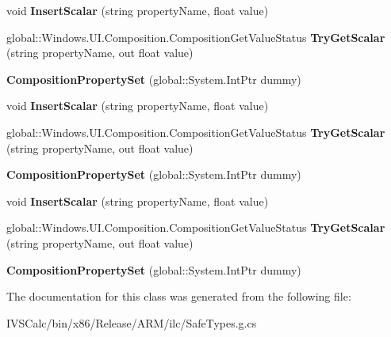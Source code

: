 \begin{DoxyCompactItemize}
void {\bfseries Insert\+Scalar} (string property\+Name, float value)
\item 
\mbox{\label{class_windows_1_1_u_i_1_1_composition_1_1_composition_property_set_ac649cea8ddd129ed7dba686111ace9a4}} 
global\+::\+Windows.\+U\+I.\+Composition.\+Composition\+Get\+Value\+Status {\bfseries Try\+Get\+Scalar} (string property\+Name, out float value)
\item 
\mbox{\label{class_windows_1_1_u_i_1_1_composition_1_1_composition_property_set_a1ffccc724ef124c5ca089ed009f6185a}} 
{\bfseries Composition\+Property\+Set} (global\+::\+System.\+Int\+Ptr dummy)
\item 
\mbox{\label{class_windows_1_1_u_i_1_1_composition_1_1_composition_property_set_abe4cc8bd1cdacfc5561505c7afcedab9}} 
void {\bfseries Insert\+Scalar} (string property\+Name, float value)
\item 
\mbox{\label{class_windows_1_1_u_i_1_1_composition_1_1_composition_property_set_ac649cea8ddd129ed7dba686111ace9a4}} 
global\+::\+Windows.\+U\+I.\+Composition.\+Composition\+Get\+Value\+Status {\bfseries Try\+Get\+Scalar} (string property\+Name, out float value)
\item 
\mbox{\label{class_windows_1_1_u_i_1_1_composition_1_1_composition_property_set_a1ffccc724ef124c5ca089ed009f6185a}} 
{\bfseries Composition\+Property\+Set} (global\+::\+System.\+Int\+Ptr dummy)
\item 
\mbox{\label{class_windows_1_1_u_i_1_1_composition_1_1_composition_property_set_abe4cc8bd1cdacfc5561505c7afcedab9}} 
void {\bfseries Insert\+Scalar} (string property\+Name, float value)
\item 
\mbox{\label{class_windows_1_1_u_i_1_1_composition_1_1_composition_property_set_ac649cea8ddd129ed7dba686111ace9a4}} 
global\+::\+Windows.\+U\+I.\+Composition.\+Composition\+Get\+Value\+Status {\bfseries Try\+Get\+Scalar} (string property\+Name, out float value)
\item 
\mbox{\label{class_windows_1_1_u_i_1_1_composition_1_1_composition_property_set_a1ffccc724ef124c5ca089ed009f6185a}} 
{\bfseries Composition\+Property\+Set} (global\+::\+System.\+Int\+Ptr dummy)
\end{DoxyCompactItemize}


The documentation for this class was generated from the following file\+:\begin{DoxyCompactItemize}
\item 
I\+V\+S\+Calc/bin/x86/\+Release/\+A\+R\+M/ilc/Safe\+Types.\+g.\+cs\end{DoxyCompactItemize}
